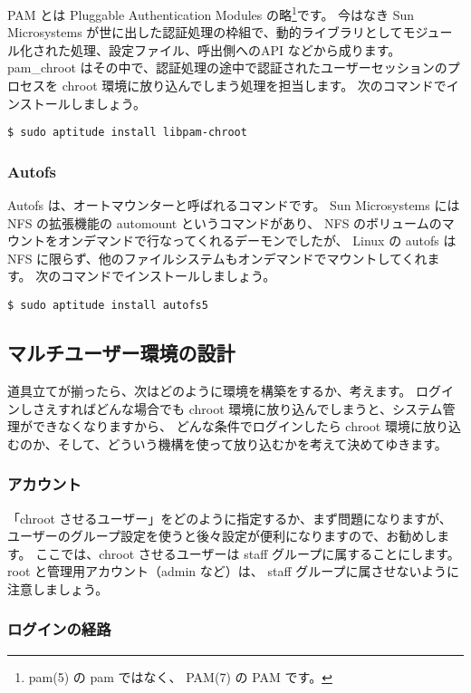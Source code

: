 PAM とは Pluggable Authentication Modules の略\footnote{pam(5) の pam ではなく、 PAM(7) の PAM です。}です。
今はなき Sun Microsystems が世に出した認証処理の枠組で、動的ライブラリとしてモジュール化された処理、設定ファイル、呼出側へのAPI などから成ります。
pam\_chroot はその中で、認証処理の途中で認証されたユーザーセッションのプロセスを chroot 環境に放り込んでしまう処理を担当します。
次のコマンドでインストールしましょう。

\begin{verbatim}
$ sudo aptitude install libpam-chroot
\end{verbatim}

\subsubsection{Autofs}

Autofs は、オートマウンターと呼ばれるコマンドです。 
Sun Microsystems には NFS の拡張機能の automount というコマンドがあり、 NFS のボリュームのマウントをオンデマンドで行なってくれるデーモンでしたが、
Linux の autofs は NFS に限らず、他のファイルシステムもオンデマンドでマウントしてくれます。
次のコマンドでインストールしましょう。

\begin{verbatim}
$ sudo aptitude install autofs5
\end{verbatim}

\subsection{マルチユーザー環境の設計}
道具立てが揃ったら、次はどのように環境を構築をするか、考えます。
ログインしさえすればどんな場合でも chroot 環境に放り込んでしまうと、システム管理ができなくなりますから、
どんな条件でログインしたら chroot 環境に放り込むのか、そして、どういう機構を使って放り込むかを考えて決めてゆきます。

\subsubsection{アカウント}

「chroot させるユーザー」をどのように指定するか、まず問題になりますが、ユーザーのグループ設定を使うと後々設定が便利になりますので、お勧めします。
ここでは、chroot させるユーザーは staff グループに属することにします。
root と管理用アカウント（admin など）は、 staff グループに属させないように注意しましょう。

\subsubsection{ログインの経路}

